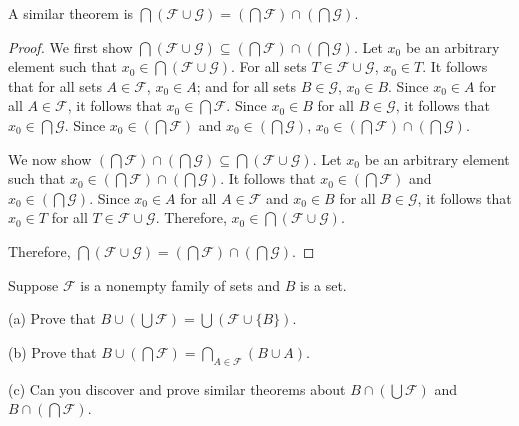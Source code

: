 A similar theorem is $\bigcap(\mathcal{F} \cup \mathcal{G}) =
    (\bigcap{\mathcal{F}}) \cap (\bigcap{\mathcal{G}})$.
\begin{proof}
    We first show $\bigcap(\mathcal{F} \cup \mathcal{G}) \subseteq (\bigcap{\mathcal{F}}) \cap (\bigcap{\mathcal{G}})$.
    Let $x_0$ be an arbitrary element such that $x_0 \in \bigcap(\mathcal{F} \cup \mathcal{G})$.
    For all sets $T \in \mathcal{F} \cup \mathcal{G}$, $x_0 \in T$.
    It follows that for all sets $A \in \mathcal{F}$, $x_0 \in A$; 
    and for all sets $B \in \mathcal{G}$, $x_0 \in B$.
    Since $x_0 \in A$ for all $A \in \mathcal{F}$, it follows that $x_0 \in \bigcap \mathcal{F}$.
    Since $x_0 \in B$ for all $B \in \mathcal{G}$, it follows that $x_0 \in \bigcap \mathcal{G}$.
    Since $x_0 \in (\bigcap\mathcal{F})$ and $x_0 \in (\bigcap\mathcal{G})$,
    $x_0 \in (\bigcap\mathcal{F}) \cap (\bigcap\mathcal{G})$.

    We now show $(\bigcap{\mathcal{F}}) \cap (\bigcap{\mathcal{G}}) \subseteq
        \bigcap(\mathcal{F} \cup \mathcal{G})$. Let $x_0$ be an arbitrary element such
    that $x_0 \in (\bigcap{\mathcal{F}}) \cap (\bigcap{\mathcal{G}})$. It follows
    that $x_0 \in (\bigcap{\mathcal{F}})$ and $x_0 \in (\bigcap{\mathcal{G}})$.
    Since $x_0 \in A$ for all $A \in \mathcal{F}$ and $x_0 \in B$ for all $B \in
        \mathcal{G}$, it follows that $x_0 \in T$ for all $T \in \mathcal{F} \cup
        \mathcal{G}$. Therefore, $x_0 \in \bigcap(\mathcal{F} \cup \mathcal{G})$.

    Therefore, $\bigcap(\mathcal{F} \cup \mathcal{G}) = (\bigcap{\mathcal{F}}) \cap
        (\bigcap{\mathcal{G}})$.
\end{proof}

\begin{tcolorbox}[title=Problem 17, breakable]
    Suppose $\mathcal{F}$ is a nonempty family of sets and $B$ is a set.

    (a) Prove that $B \cup (\bigcup \mathcal{F}) = \bigcup(\mathcal{F} \cup \{B\})$.

    (b) Prove that $B \cup (\bigcap \mathcal{F}) = \bigcap_{A \in \mathcal{F}}(B \cup A)$.

    (c) Can you discover and prove similar theorems about $B \cap (\bigcup \mathcal{F})$
    and $B \cap (\bigcap \mathcal{F})$.
\end{tcolorbox}

